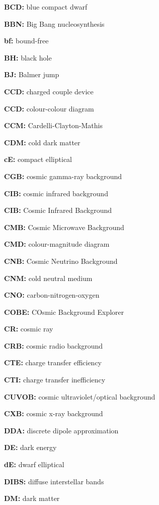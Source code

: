 \documentclass[a4paper,10pt]{article}
\begin{document}
{\noindent}\textbf{BCD:} blue compact dwarf

{\noindent}\textbf{BBN:} Big Bang nucleosynthesis

{\noindent}\textbf{bf:} bound-free

{\noindent}\textbf{BH:} black hole

{\noindent}\textbf{BJ:} Balmer jump

{\noindent}\textbf{CCD:} charged couple device

{\noindent}\textbf{CCD:} colour-colour diagram

{\noindent}\textbf{CCM:} Cardelli-Clayton-Mathis

{\noindent}\textbf{CDM:} cold dark matter

{\noindent}\textbf{cE:} compact elliptical

{\noindent}\textbf{CGB:} cosmic gamma-ray background

{\noindent}\textbf{CIB:} cosmic infrared background

{\noindent}\textbf{CIB:} Cosmic Infrared Background

{\noindent}\textbf{CMB:} Cosmic Microwave Background

{\noindent}\textbf{CMD:} colour-magnitude diagram

{\noindent}\textbf{CNB:} Cosmic Neutrino Background

{\noindent}\textbf{CNM:} cold neutral medium

{\noindent}\textbf{CNO:} carbon-nitrogen-oxygen

{\noindent}\textbf{COBE:} COsmic Background Explorer

{\noindent}\textbf{CR:} cosmic ray

{\noindent}\textbf{CRB:} cosmic radio background

{\noindent}\textbf{CTE:} charge transfer efficiency

{\noindent}\textbf{CTI:} charge transfer inefficiency

{\noindent}\textbf{CUVOB:} cosmic ultraviolet/optical background

{\noindent}\textbf{CXB:} cosmic x-ray background

{\noindent}\textbf{DDA:} discrete dipole approximation

{\noindent}\textbf{DE:} dark energy

{\noindent}\textbf{dE:} dwarf elliptical

{\noindent}\textbf{DIBS:} diffuse interstellar bands

{\noindent}\textbf{DM:} dark matter
\end{document}
